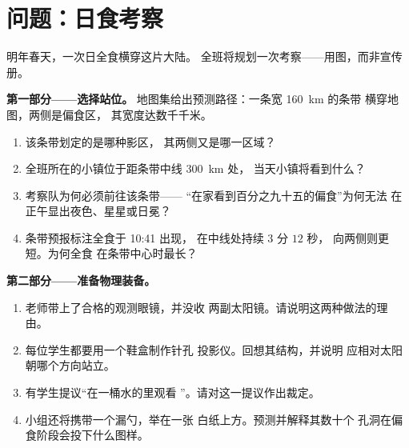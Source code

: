 \section{问题：日食考察}

\begin{problem}\label{pb:g7:shadows-eclipses:1}
明年春天，一次日全食横穿这片大陆。
全班将规划一次考察——用图，而非宣传册。

\medskip\noindent\textbf{第一部分——选择站位。}
地图集给出预测路径：一条宽 \qty{160}{km} 的条带
横穿地图，两侧是偏食区，
其宽度达数千千米。
\begin{enumerate}
  \item 该条带划定的是哪种影区，
        其两侧又是哪一区域？
  \item 全班所在的小镇位于距条带中线 \qty{300}{km} 处，
        当天小镇将看到什么？
  \item 考察队为何必须前往该条带——
        “在家看到百分之九十五的偏食”为何无法
        在正午显出夜色、星星或日冕？
  \item 条带预报标注全食于 10:41 出现，
        在中线处持续 $3$ 分 $12$ 秒，
        向两侧则更短。为何全食
        在条带中心时最长？
\end{enumerate}

\medskip\noindent\textbf{第二部分——准备物理装备。}
\begin{enumerate}[resume]
  \item 老师带上了合格的观测眼镜，并没收
        两副太阳镜。请说明这两种做法的理由。
  \item 每位学生都要用一个鞋盒制作针孔
        投影仪。回想其结构，并说明
        应相对太阳朝哪个方向站立。
  \item 有学生提议“在一桶水的里观看
        ”。请对这一提议作出裁定。
  \item 小组还将携带一个漏勺，举在一张
        白纸上方。预测并解释其数十个
        孔洞在偏食阶段会投下什么图样。
\end{enumerate}


\end{problem}
